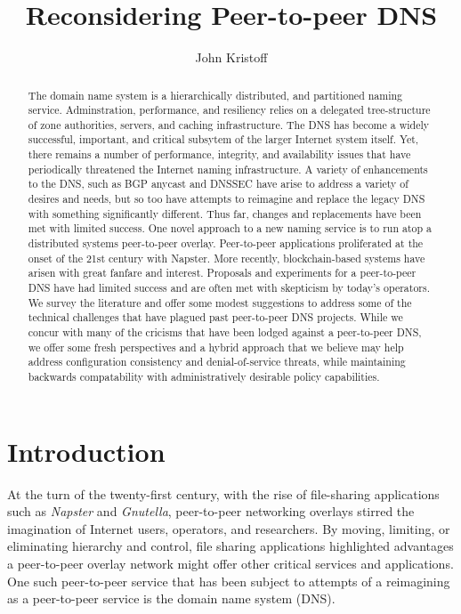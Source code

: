 \documentclass[sigconf]{acmart}
\begin{document}
\title{Reconsidering Peer-to-peer DNS}
\author{John Kristoff}

\begin{abstract}

The domain name system is a hierarchically distributed, and partitioned
naming service.  Adminstration, performance, and resiliency relies on a
delegated tree-structure of zone authorities, servers, and caching
infrastructure.  The DNS has become a widely successful, important, and
critical subsytem of the larger Internet system itself.  Yet, there
remains a number of performance, integrity, and availability issues that
have periodically threatened the Internet naming infrastructure.  A
variety of enhancements to the DNS, such as BGP anycast and DNSSEC have
arise to address a variety of desires and needs, but so too have
attempts to reimagine and replace the legacy DNS with something
significantly different.  Thus far, changes and replacements have been
met with limited success.  One novel approach to a new naming service is
to run atop a distributed systems peer-to-peer overlay.  Peer-to-peer
applications proliferated at the onset of the 21st century with Napster.
More recently, blockchain-based systems have arisen with great fanfare
and interest.  Proposals and experiments for a peer-to-peer DNS have had
limited success and are often met with skepticism by today's operators.
We survey the literature and offer some modest suggestions to address
some of the technical challenges that have plagued past peer-to-peer DNS
projects.  While we concur with many of the cricisms that have been
lodged against a peer-to-peer DNS, we offer some fresh perspectives and
a hybrid approach that we believe may help address configuration
consistency and denial-of-service threats, while maintaining backwards
compatability with administratively desirable policy capabilities.

\end{abstract}

\maketitle

\section{Introduction}

At the turn of the twenty-first century, with the rise of file-sharing
applications such as \emph{Napster} and \emph{Gnutella}, peer-to-peer
networking overlays stirred the imagination of Internet users,
operators, and researchers.  By moving, limiting, or eliminating
hierarchy and control, file sharing applications highlighted advantages
a peer-to-peer overlay network might offer other critical services and
applications.  One such peer-to-peer service that has been subject to
attempts of a reimagining as a peer-to-peer service is the domain name
system (DNS).
\end{document}
